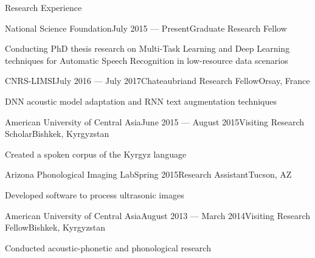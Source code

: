 \documentclass{resume} %
\begin{document}
\begin{rSection}{Research Experience}

\begin{rSubsection}{National Science Foundation}{July 2015 --- Present}{Graduate Research Fellow}{}
\item Conducting PhD thesis research on Multi-Task Learning and Deep Learning techniques for Automatic Speech Recognition in low-resource data scenarios
\end{rSubsection}


\begin{rSubsection}{CNRS-LIMSI}{July 2016 --- July 2017}{Chateaubriand Research Fellow}{Orsay, France}
\item DNN acoustic model adaptation and RNN text augmentation techniques
\end{rSubsection}

\begin{rSubsection}{American University of Central Asia}{June 2015 --- August 2015}{Visiting Research Scholar}{Bishkek, Kyrgyzstan}
\item Created a spoken corpus of the Kyrgyz language
\end{rSubsection}

\begin{rSubsection}{Arizona Phonological Imaging Lab}{Spring 2015}{Research Assistant}{Tucson, AZ}
\item Developed software to process ultrasonic images
\end{rSubsection}

\begin{rSubsection}{American University of Central Asia}{August 2013 --- March 2014}{Visiting Research Fellow}{Bishkek, Kyrgyzstan}
\item Conducted acoustic-phonetic and phonological research
\end{rSubsection}



\end{rSection}
\end{document}
